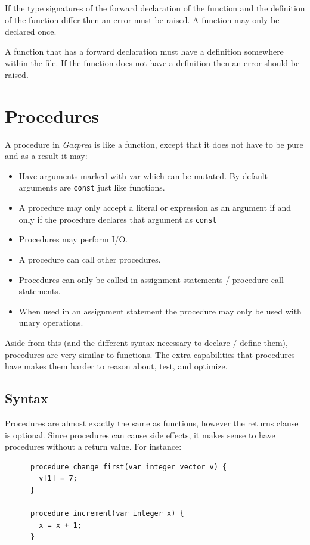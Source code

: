 \documentclass{article}
\begin{document}
    If the type signatures of the forward declaration of the function and the definition of the function differ then
    an error must be raised. A function may only be declared once.

    A function that has a forward declaration must have a definition somewhere within the file. If the function does
    not have a definition then an error should be raised.


\section{Procedures}\label{sec:procedure}

  A procedure in \textit{Gazprea} is like a function, except that it does not have to be pure and as a result it may:

  \begin{itemize}
    \item Have arguments marked with var which can be mutated. By default arguments are \texttt{const} just like
    functions.
    \item A procedure may only accept a literal or expression as an argument if and only if the procedure declares
    that argument as \texttt{const}
    \item Procedures may perform I/O.
    \item A procedure can call other procedures.
    \item Procedures can only be called in assignment statements / procedure call statements.
    \item When used in an assignment statement the procedure may only be used with unary operations.
  \end{itemize}

  Aside from this (and the different syntax necessary to declare / define them), procedures are very similar to
  functions. The extra capabilities that procedures have makes them harder to reason about, test, and optimize.


  \subsection{Syntax}

    Procedures are almost exactly the same as functions, however the returns clause is optional. Since procedures
    can cause side effects, it makes sense to have procedures without a return value. For instance:

    \begin{lstlisting}
      procedure change_first(var integer vector v) {
        v[1] = 7;
      }

      procedure increment(var integer x) {
        x = x + 1;
      }
    \end{lstlisting}
\end{document}
